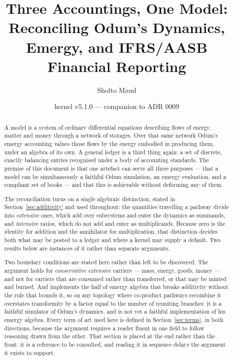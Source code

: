 \documentclass[11pt,a4paper]{article}
\title{Three Accountings, One Model: Reconciling Odum's Dynamics, Emergy, and IFRS/AASB Financial Reporting}
\author{Sholto Maud}
\date{\gssk{} kernel v5.1.0 --- companion to ADR 0009}
\begin{document}
\maketitle

\begin{abstract}
A \gssk{} model is a system of ordinary differential equations describing flows of energy, matter and money through a network of storages. Over that same network Odum's emergy accounting values those flows by the energy embodied in producing them, under an algebra of its own. A general ledger is a third thing again: a set of discrete, exactly balancing entries recognised under a body of accounting standards. The premise of this document is that one artefact can serve all three purposes --- that a model can be simultaneously a faithful Odum simulation, an emergy evaluation, and a compliant set of books --- and that this is achievable without deforming any of them.

The reconciliation turns on a single algebraic distinction, stated in Section~\ref{sec:additivity} and used throughout: the quantities travelling a pathway divide into \emph{extensive} ones, which add over subsystems and enter the dynamics as summands, and \emph{intensive} ratios, which do not add and enter as multiplicands. Because zero is the identity for addition and the annihilator for multiplication, that distinction decides both what may be posted to a ledger and where a kernel may supply a default. Two results below are instances of it rather than separate arguments.

Two boundary conditions are stated here rather than left to be discovered. The argument holds for \emph{conservative extensive} carriers --- mass, energy, goods, money --- and not for carriers that are consumed rather than transferred, or that may be minted and burned. And \gssk{} implements the half of emergy algebra that breaks additivity without the rule that bounds it, so on any topology where co-product pathways recombine it overstates transformity by a factor equal to the number of reuniting branches: it is a faithful simulator of Odum's dynamics, and is not yet a faithful implementation of his emergy algebra. Every term of art used here is defined in Section~\ref{sec:terms}, in both directions, because the argument requires a reader fluent in one field to follow reasoning drawn from the other. That section is placed at the end rather than the front: it is a reference to be consulted, and reading it in sequence delays the argument it exists to support.


\end{abstract}
\end{document}
